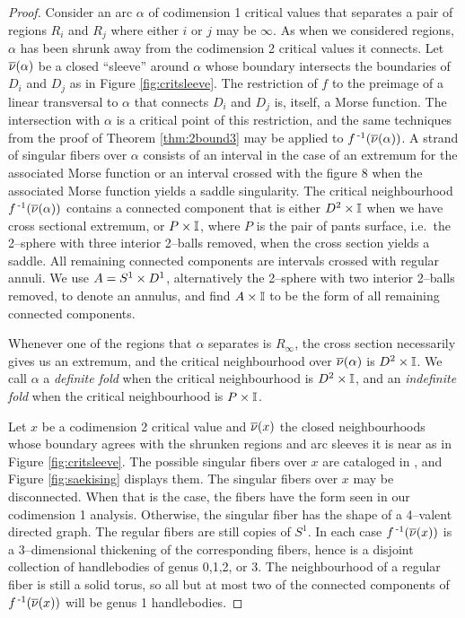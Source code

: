 \begin{proof}
	
	Consider an arc $\alpha$ of codimension 1 critical values that separates a pair of regions $R_i$ and $R_j$ where either $i$ or $j$ may be $\infty$.
	As when we considered regions, $\alpha$ has been shrunk away from the codimension 2 critical values it connects.
	Let $\overline{\nu}(\alpha)$ be a closed ``sleeve'' around $\alpha$ whose boundary intersects the boundaries of $D_i$ and $D_j$ as in Figure \ref{fig:critsleeve}.
	The restriction of $f$ to the preimage of a linear transversal to $\alpha$ that connects $D_i$ and $D_j$ is, itself, a Morse function.
	The intersection with $\alpha$ is a critical point of this restriction, and the same techniques from the proof of Theorem \ref{thm:2bound3} may be applied to $f^{\,\text{-}1}(\overline{\nu}(\alpha))$.
	A strand of singular fibers over $\alpha$ consists of an interval in the case of an extremum for the associated Morse function or an interval crossed with the figure 8 when the associated Morse function yields a saddle singularity.
	The critical neighbourhood $f^{\,\text{-}1}(\overline{\nu}(\alpha))$ contains a connected component that is either $D^2\times\mathbb{I}$ when we have cross sectional extremum, or $P\times\mathbb{I}$, where $P$ is the pair of pants surface, i.e.\ the 2--sphere with three interior 2--balls removed, when the cross section yields a saddle.
	All remaining connected components are intervals crossed with regular annuli.
	We use $A=S^1\times D^1$, alternatively the 2--sphere with two interior 2--balls removed, to denote an annulus, and find $A\times\mathbb{I}$ to be the form of all remaining connected components.
	
	Whenever one of the regions that $\alpha$ separates is $R_\infty$, the cross section necessarily gives us an extremum, and the critical neighbourhood over $\overline{\nu}(\alpha)$ is $D^2\times\mathbb{I}$.
	We call $\alpha$ a \emph{definite fold} when the critical neighbourhood is $D^2\times\mathbb{I}$, and an \emph{indefinite fold} when the critical neighbourhood is $P\times\mathbb{I}$.
	
	Let $x$ be a codimension 2 critical value and $\overline{\nu}(x)$ the closed neighbourhoods whose boundary agrees with the shrunken regions and arc sleeves it is near as in Figure \ref{fig:critsleeve}.
	The possible singular fibers over $x$ are cataloged in \cite{Saeki}, and Figure \ref{fig:saekising} displays them.
	The singular fibers over $x$ may be disconnected.
	When that is the case, the fibers have the form seen in our codimension 1 analysis.
	Otherwise, the singular fiber has the shape of a 4--valent directed graph.
	The regular fibers are still copies of $S^1$.
	In each case $f^{\,\text{-}1}(\overline{\nu}(x))$ is a 3--dimensional thickening of the corresponding fibers, hence is a disjoint collection of handlebodies of genus 0,1,2, or 3.
	The neighbourhood of a regular fiber is still a solid torus, so all but at most two of the connected components of $f^{\,\text{-}1}(\overline{\nu}(x))$ will be genus 1 handlebodies.
	


\end{proof}
